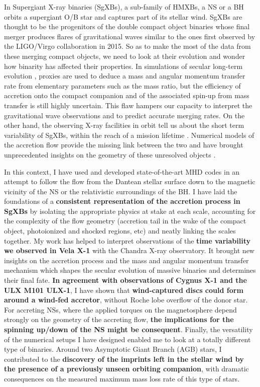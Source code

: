 \documentclass[11pt,onecolumn]{article}
\makeatletter
\newcommand{\sgxs}{SgXBs\xspace}
\newcommand{\ulx}{ULX\xspace}
\newcommand*{\hmxbs}{HMXBs\@\xspace}
\newcommand*{\ns}{NS\@\xspace}
\newcommand*{\nss}{NSs\@\xspace}
\newcommand*{\bh}{BH\@\xspace}
\makeatother
\begin{document}
In Supergiant X-ray binaries (\sgxs), a sub-family of \hmxbs, a \ns or a \bh orbits a supergiant O/B star and captures part of its stellar wind. \sgxs are thought to be the progenitors of the double compact object binaries whose final merger produces flares of gravitational waves similar to the ones first observed by the LIGO/Virgo collaboration in 2015. So as to make the most of the data from these merging compact objects, we need to look at their evolution and wonder how binarity has affected their properties. In simulations of secular long-term evolution \citep{Tauris2003a}, proxies are used to deduce a mass and angular momentum transfer rate from elementary parameters such as the mass ratio, but the efficiency of accretion onto the compact companion and of the associated spin-up from mass transfer is still highly uncertain. This flaw hampers our capacity to interpret the gravitational wave observations and to predict accurate merging rates. On the other hand, the observing X-ray facilities in orbit tell us about the short term variability of \sgxs, within the reach of a mission lifetime \citep{Furst2018}. Numerical models of the accretion flow provide the missing link between the two and have brought unprecedented insights on the geometry of these unresolved objects \citep{Blondin1991}.

In this context, I have used and developed state-of-the-art MHD codes in an attempt to follow the flow from the Dantean stellar surface down to the magnetic vicinity of the \ns or the relativistic surroundings of the \bh. I have laid the foundations of a \textbf{consistent representation of the accretion process in \sgxs} by isolating the appropriate physics at stake at each scale, accounting for the complexity of the flow geometry (accretion tail in the wake of the compact object, photoionized and shocked regions, etc) and neatly linking the scales together. My work has helped to interpret observations of the \textbf{time variability we observed in Vela X-1} with the Chandra X-ray observatory. It brought new insights on the accretion process and the mass and angular momentum transfer mechanism which shapes the secular evolution of massive binaries and determines their final fate. \textbf{In agreement with observations of Cygnus X-1 and the \ulx M101 ULX-1}, I have shown that \textbf{wind-captured discs could form around a wind-fed accretor}, without Roche lobe overflow of the donor star. For accreting \nss, where the applied torques on the magnetosphere depend strongly on the geometry of the accreting flow, \textbf{the implications for the spinning up/down of the \ns might be consequent}. Finally, the versatility of the numerical setups I have designed enabled me to look at a totally different type of binaries. Around two Asymptotic Giant Branch (AGB) stars, I contributed to the \textbf{discovery of the imprints left in the stellar wind by the presence of a previously unseen orbiting companion}, with dramatic consequences on the measured maximum mass loss rate of this type of stars.
\end{document}
